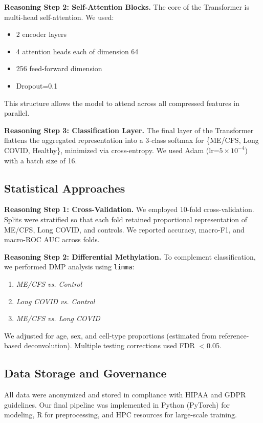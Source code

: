 \documentclass[journal]{IEEEtran}
\begin{document}
\textbf{Reasoning Step 2: Self-Attention Blocks.}
The core of the Transformer is multi-head self-attention. We used:
\begin{itemize}[leftmargin=1em]
\item 2 encoder layers
\item 4 attention heads each of dimension 64
\item 256 feed-forward dimension
\item Dropout=0.1
\end{itemize}
This structure allows the model to attend across all compressed features in parallel.

\textbf{Reasoning Step 3: Classification Layer.}
The final layer of the Transformer flattens the aggregated representation into a 3-class softmax for \{ME/CFS, Long COVID, Healthy\}, minimized via cross-entropy. We used Adam (lr=$5\times10^{-4}$) with a batch size of 16.

\subsection{Statistical Approaches}
\textbf{Reasoning Step 1: Cross-Validation.}
We employed 10-fold cross-validation. Splits were stratified so that each fold retained proportional representation of ME/CFS, Long COVID, and controls. We reported accuracy, macro-F1, and macro-ROC AUC across folds.

\textbf{Reasoning Step 2: Differential Methylation.}
To complement classification, we performed DMP analysis using \texttt{limma}:
\begin{enumerate}[leftmargin=1em]
\item \textit{ME/CFS vs. Control}
\item \textit{Long COVID vs. Control}
\item \textit{ME/CFS vs. Long COVID}
\end{enumerate}
We adjusted for age, sex, and cell-type proportions (estimated from reference-based deconvolution). Multiple testing corrections used FDR $<$0.05.

\subsection{Data Storage and Governance}
All data were anonymized and stored in compliance with HIPAA and GDPR guidelines. Our final pipeline was implemented in Python (PyTorch) for modeling, R for preprocessing, and HPC resources for large-scale training.

\end{document}
